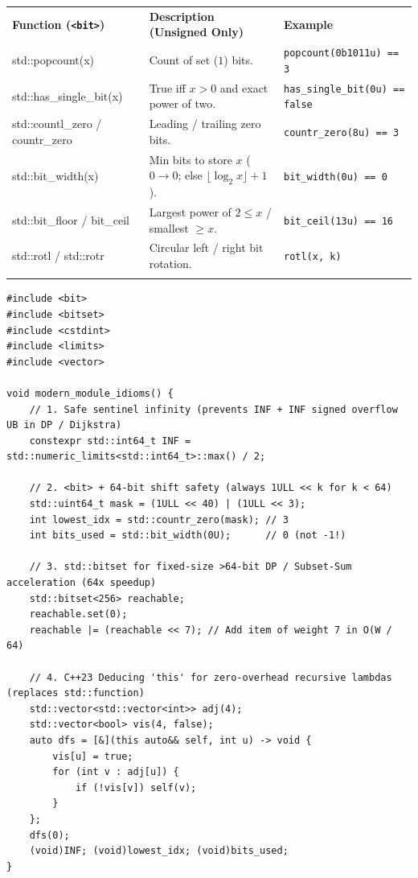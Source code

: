 \documentclass[11pt,a4paper]{article}
\begin{document}
\begingroup\footnotesize{}
\begin{tabularx}{\textwidth}{>{\raggedright\arraybackslash\ttfamily}p{3.9cm} >{\raggedright\arraybackslash}X >{\raggedright\arraybackslash}p{4.3cm}}
\arrayrulecolor{primaryblue}\toprule[1.1pt]
\rowcolor{primaryblue!10}
\textcolor{primaryblue}{\normalfont\bfseries Function (\texttt{<bit>})} & \textcolor{primaryblue}{\textbf{Description (Unsigned Only)}} & \textcolor{primaryblue}{\textbf{Example}} \\
\arrayrulecolor{codeframe}\midrule[0.6pt]
std::popcount(x) & Count of set ($1$) bits. & \texttt{popcount(0b1011u) == 3} \\
std::has\_single\_bit(x) & True iff $x > 0$ and exact power of two. & \texttt{has\_single\_bit(0u) == false} \\
std::countl\_zero / countr\_zero & Leading / trailing zero bits. & \texttt{countr\_zero(8u) == 3} \\
std::bit\_width(x) & Min bits to store $x$ ($0 \to 0$; else $\lfloor \log_2 x \rfloor + 1$). & \texttt{bit\_width(0u) == 0} \\
std::bit\_floor / bit\_ceil & Largest power of $2 \le x$ / smallest $\ge x$. & \texttt{bit\_ceil(13u) == 16} \\
std::rotl / std::rotr & Circular left / right bit rotation. & \texttt{rotl(x, k)} \\
\arrayrulecolor{primaryblue}\bottomrule[1.1pt]
\end{tabularx}\endgroup

\begin{lstlisting}[caption={Modules 09--12 idioms: \texttt{<bit>}, \texttt{std::bitset}, safe \texttt{INF}, and C++23 deducing \texttt{this}}]
#include <bit>
#include <bitset>
#include <cstdint>
#include <limits>
#include <vector>

void modern_module_idioms() {
    // 1. Safe sentinel infinity (prevents INF + INF signed overflow UB in DP / Dijkstra)
    constexpr std::int64_t INF = std::numeric_limits<std::int64_t>::max() / 2;

    // 2. <bit> + 64-bit shift safety (always 1ULL << k for k < 64)
    std::uint64_t mask = (1ULL << 40) | (1ULL << 3);
    int lowest_idx = std::countr_zero(mask); // 3
    int bits_used = std::bit_width(0U);      // 0 (not -1!)

    // 3. std::bitset for fixed-size >64-bit DP / Subset-Sum acceleration (64x speedup)
    std::bitset<256> reachable;
    reachable.set(0);
    reachable |= (reachable << 7); // Add item of weight 7 in O(W / 64)

    // 4. C++23 Deducing 'this' for zero-overhead recursive lambdas (replaces std::function)
    std::vector<std::vector<int>> adj(4);
    std::vector<bool> vis(4, false);
    auto dfs = [&](this auto&& self, int u) -> void {
        vis[u] = true;
        for (int v : adj[u]) {
            if (!vis[v]) self(v);
        }
    };
    dfs(0);
    (void)INF; (void)lowest_idx; (void)bits_used;
}
\end{lstlisting}
\end{document}
